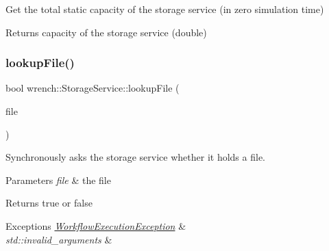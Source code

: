 Get the total static capacity of the storage service (in zero simulation time) 

\begin{DoxyReturn}{Returns}
capacity of the storage service (double) 
\end{DoxyReturn}
\mbox{\label{classwrench_1_1_storage_service_aa0880c02e803fad5f2b467c91b520519}} 
\subsubsection{\texorpdfstring{lookup\+File()}{lookupFile()}\hspace{0.1cm}{\footnotesize\ttfamily [1/2]}}
{\footnotesize\ttfamily bool wrench\+::\+Storage\+Service\+::lookup\+File (\begin{DoxyParamCaption}\item[{\hyperlink{classwrench_1_1_workflow_file}{Workflow\+File} $\ast$}]{file }\end{DoxyParamCaption})\hspace{0.3cm}{\ttfamily [virtual]}}



Synchronously asks the storage service whether it holds a file. 


\begin{DoxyParams}{Parameters}
{\em file} & the file\\
\hline
\end{DoxyParams}
\begin{DoxyReturn}{Returns}
true or false
\end{DoxyReturn}

\begin{DoxyExceptions}{Exceptions}
{\em \hyperlink{classwrench_1_1_workflow_execution_exception}{Workflow\+Execution\+Exception}} & \\
\hline
{\em std\+::invalid\+\_\+arguments} & \\
\hline
\end{DoxyExceptions}
\mbox{\label{classwrench_1_1_storage_service_a348189474e741dab4893213b5bcca1d1}} 
